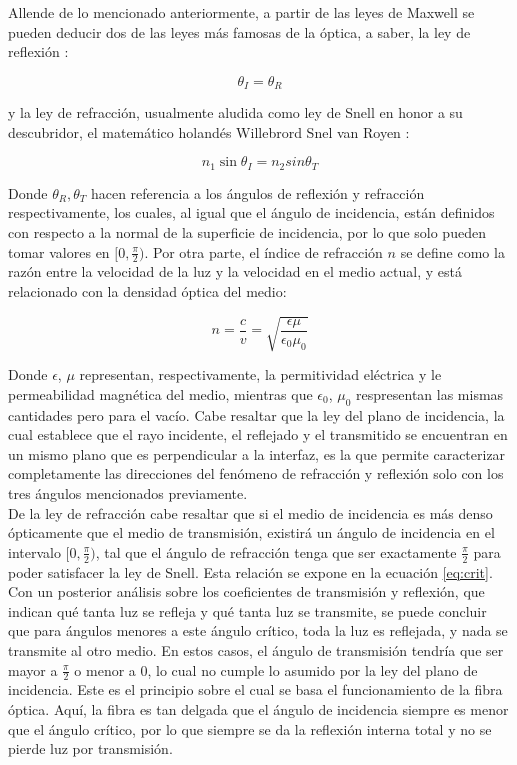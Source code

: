 \documentclass[prb,aps,twocolumn,preprintnumbers,amsmath,amssymb]{revtex4}
\begin{document}
Allende de lo mencionado anteriormente, a partir de las leyes de Maxwell se pueden deducir dos de las leyes más famosas de la óptica, a saber, la ley de reflexión \cite{Griffiths}:

\begin{equation}
\label{eq:reflexion}
\theta_I = \theta_R
\end{equation}

y la ley de refracción, usualmente aludida como ley de Snell en honor a su descubridor, el matemático holandés Willebrord Snel van Royen \cite{Griffiths}: 

\begin{equation}
n_1\sin{\theta_I} = n_2sin{\theta_T}
\label{eq:snell}
\end{equation}

Donde $\theta_R, \theta_T$ hacen referencia a los ángulos de reflexión y refracción respectivamente, los cuales, al igual que el ángulo de incidencia, están definidos con respecto a la normal de la superficie de incidencia, por lo que solo pueden tomar valores en $[0,\frac{\pi}{2})$. Por otra parte, el índice de refracción $n$ se define como la razón entre la velocidad de la luz y la velocidad en el medio actual, y está relacionado con la densidad óptica del medio:

\begin{equation}
n = \frac{c}{v} = \sqrt{\frac{\epsilon\mu}{\epsilon_0\mu_0}}
\label{eq:indice}
\end{equation}

Donde $\epsilon$, $\mu$ representan,  respectivamente, la permitividad eléctrica y le permeabilidad magnética del medio, mientras que $\epsilon_0$, $\mu_0$ respresentan las mismas cantidades pero para el vacío. Cabe resaltar que la ley del plano de incidencia, la cual establece que el rayo incidente, el reflejado y el transmitido se encuentran en un mismo plano que es perpendicular a la interfaz, es la que permite caracterizar completamente las direcciones del fenómeno de refracción y reflexión solo con los tres ángulos mencionados previamente.\\

De la ley de refracción cabe resaltar que si el medio de incidencia es más denso ópticamente que el medio de transmisión, existirá un ángulo de incidencia en el intervalo $[0,\frac{\pi}{2})$, tal que el ángulo de refracción tenga que ser exactamente $\frac{\pi}{2}$ para poder satisfacer la ley de Snell. Esta relación se expone en la ecuación \eqref{eq:crit}. Con un posterior análisis sobre los coeficientes de transmisión y reflexión, que indican qué tanta luz se refleja y qué tanta luz se transmite, se puede concluir que para ángulos menores a este ángulo crítico, toda la luz es reflejada, y nada se transmite al otro medio. En estos casos, el ángulo de transmisión tendría que ser mayor a $\frac{\pi}{2}$ o menor a $0$, lo cual no cumple lo asumido por la ley del plano de incidencia. Este es el principio sobre el cual se basa el funcionamiento de la fibra óptica. Aquí, la fibra es tan delgada que el ángulo de incidencia siempre es menor que el ángulo crítico, por lo que siempre se da la reflexión interna total y no se pierde luz por transmisión.
\end{document}
